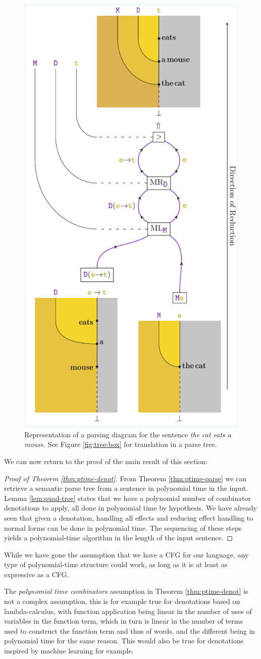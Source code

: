 \begin{figure}
	\centering
	\includegraphics[width=.45\textwidth]{parsing-diagram}
	\caption{Representation of a parsing diagram for the sentence
		\emph{the cat eats a mouse}.
		See Figure \ref{fig:tree-box} for translation in a parse tree.}
	\label{fig:parsing-diagram}
\end{figure}

We can now return to the proof of the main result of this section:
\begin{proof}[Proof of Theorem \ref{thm:ptime-denot}]
	From Theorem \ref{thm:ptime-parse} we can retrieve a
	semantic parse tree from a sentence in polynomial time in the input.
	Lemma \ref{lem:quad-tree} states that we have a polynomial number of
	combinator denotations to apply, all done in polynomial time by hypothesis.
	We have already seen that given a denotation, handling all effects and
	reducing effect handling to normal forms can be done in polynomial time.
	The sequencing of these steps yields a polynomial-time algorithm in the
	length of the input sentence.
\end{proof}

While we have gone the assumption that we have a CFG for our language,
any type of polynomial-time structure could work, as long as it is at least
as expressive as a CFG.

The \emph{polynomial time combinators} assumption in Theorem
\ref{thm:ptime-denot} is not a complex assumption, this is for example true for
denotations based on lambda-calculus, with function application being linear in
the number of uses of variables in the function term, which in turn is linear
in the number of terms used to construct the function term and thus of words,
and the different \fmap{} being in polynomial time for the same reason.
This would also be true for denotations inspired by machine learning for
example.

